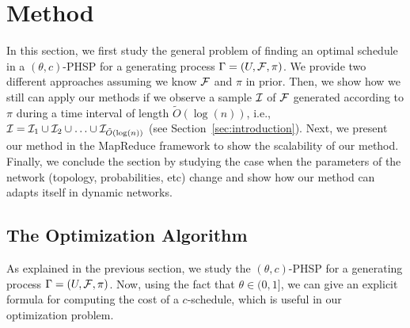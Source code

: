 \section{Method}\label{sec:method}
In this section, we first study the general problem of finding an optimal schedule in a  $(\theta,c)$-PHSP for a generating process $\sys = (U, \F, \pi)$. We provide two different approaches assuming we know $\F$ and $\pi$ in prior.  Then, we show how we still can apply our methods if we observe a sample $\S$ of $\F$ generated according to $\pi$ during a time interval of length $\tilde O(\log(n))$, i.e., $\S = \S_1\cup\S_2\cup\ldots\cup\S_{\tilde O(\log(n))}$ (see Section~\ref{sec:introduction}). Next, we present our method in the MapReduce framework to show the scalability of our method. Finally, we conclude the section by studying the case when the parameters of the network (topology, probabilities, etc) change and show how our method can adapts itself in dynamic networks.


% 



\subsection{The Optimization Algorithm}\label{sec:optimize}
As explained in the previous section, we study the $(\theta,c)$-PHSP for a generating process $\sys=(U, \F, \pi)$. Now, using the fact that $\theta \in (0,1]$, we can give an explicit formula for computing the cost of a $c$-schedule, which is useful in our optimization problem.

